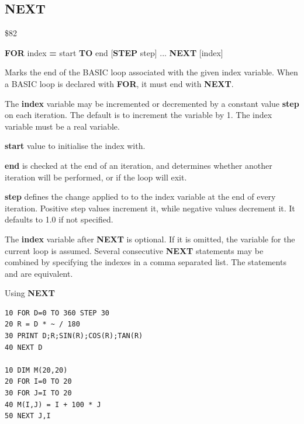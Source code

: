 \subsection{NEXT}
\begin{description}[leftmargin=2cm,style=nextline]
\item [Token:] \$82
\item [Format:] {\bf FOR} index {\bf =} start {\bf TO} end
		[{\bf STEP} step] ... {\bf NEXT} [index]
\item [Usage:] Marks the end of the BASIC loop associated with the given index variable. When
               a BASIC loop is declared with {\bf FOR}, it must end with
               {\bf NEXT}.


               The {\bf index} variable may be incremented or decremented
               by a constant value {\bf step} on each iteration. The default
               is to increment the variable by 1.
               The index variable must be a real variable.

               {\bf start} value to initialise the index with.

               {\bf end} is checked at the end of an iteration,
               and determines whether another iteration will be performed,
               or if the loop will exit.

               {\bf step} defines the change applied to
               to the index variable at the end of every iteration.
               Positive step values increment it, while negative values
               decrement it. It defaults to 1.0 if not specified.

\item [Remarks:] The {\bf index} variable after {\bf NEXT} is
               optional. If it is omitted, the variable
               for the current loop is assumed.
               Several consecutive {\bf NEXT} statements may be
               combined by specifying the indexes in a comma
               separated list. The statements
                and
                are equivalent.

\item [Example:] Using {\bf NEXT}
\begin{tcolorbox}[colback=black,coltext=white]
\verbatimfont{\codefont}
\begin{verbatim}
10 FOR D=0 TO 360 STEP 30
20 R = D * ~ / 180
30 PRINT D;R;SIN(R);COS(R);TAN(R)
40 NEXT D

10 DIM M(20,20)
20 FOR I=0 TO 20
30 FOR J=I TO 20
40 M(I,J) = I + 100 * J
50 NEXT J,I
\end{verbatim}
\end{tcolorbox}
\end{description}

